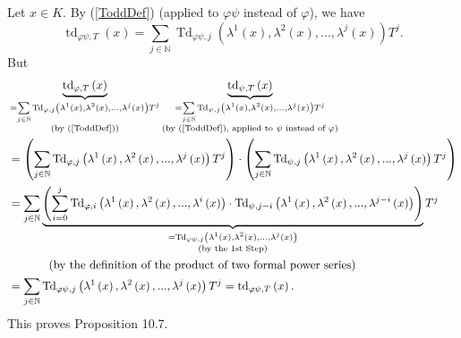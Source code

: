 \documentclass[numbers=enddot,12pt,final,onecolumn,notitlepage]{scrartcl}%
\begin{document}
Let $x\in K$. By (\ref{ToddDef}) (applied to $\varphi\psi$ instead of
$\varphi$), we have%
\[
\operatorname*{td}\nolimits_{\varphi\psi,T}\left(  x\right)  =\sum
_{j\in\mathbb{N}}\operatorname*{Td}\nolimits_{\varphi\psi,j}\left(
\lambda^{1}\left(  x\right)  ,\lambda^{2}\left(  x\right)  ,...,\lambda
^{j}\left(  x\right)  \right)  T^{j}.
\]
But%
\begin{align*}
&  \underbrace{\operatorname*{td}\nolimits_{\varphi,T}\left(  x\right)
}_{\substack{=\sum\limits_{j\in\mathbb{N}}\operatorname*{Td}\nolimits_{\varphi
,j}\left(  \lambda^{1}\left(  x\right)  ,\lambda^{2}\left(  x\right)
,...,\lambda^{j}\left(  x\right)  \right)  T^{j}\\\text{(by (\ref{ToddDef}))}%
}}\underbrace{\operatorname*{td}\nolimits_{\psi,T}\left(  x\right)
}_{\substack{=\sum\limits_{j\in\mathbb{N}}\operatorname*{Td}\nolimits_{\psi
,j}\left(  \lambda^{1}\left(  x\right)  ,\lambda^{2}\left(  x\right)
,...,\lambda^{j}\left(  x\right)  \right)  T^{j}\\\text{(by (\ref{ToddDef}),
applied to }\psi\text{ instead of }\varphi\text{)}}}\\
&  =\left(  \sum\limits_{j\in\mathbb{N}}\operatorname*{Td}\nolimits_{\varphi
,j}\left(  \lambda^{1}\left(  x\right)  ,\lambda^{2}\left(  x\right)
,...,\lambda^{j}\left(  x\right)  \right)  T^{j}\right)  \cdot\left(
\sum\limits_{j\in\mathbb{N}}\operatorname*{Td}\nolimits_{\psi,j}\left(
\lambda^{1}\left(  x\right)  ,\lambda^{2}\left(  x\right)  ,...,\lambda
^{j}\left(  x\right)  \right)  T^{j}\right) \\
&  =\sum\limits_{j\in\mathbb{N}}\underbrace{\left(  \sum\limits_{i=0}%
^{j}\operatorname*{Td}\nolimits_{\varphi,i}\left(  \lambda^{1}\left(
x\right)  ,\lambda^{2}\left(  x\right)  ,...,\lambda^{i}\left(  x\right)
\right)  \cdot\operatorname*{Td}\nolimits_{\psi,j-i}\left(  \lambda^{1}\left(
x\right)  ,\lambda^{2}\left(  x\right)  ,...,\lambda^{j-i}\left(  x\right)
\right)  \right)  }_{\substack{=\operatorname*{Td}\nolimits_{\varphi\psi
,j}\left(  \lambda^{1}\left(  x\right)  ,\lambda^{2}\left(  x\right)
,...,\lambda^{j}\left(  x\right)  \right)  \\\text{(by the 1st Step)}}}T^{j}\\
&  \ \ \ \ \ \ \ \ \ \ \left(  \text{by the definition of the product of two
formal power series}\right) \\
&  =\sum_{j\in\mathbb{N}}\operatorname*{Td}\nolimits_{\varphi\psi,j}\left(
\lambda^{1}\left(  x\right)  ,\lambda^{2}\left(  x\right)  ,...,\lambda
^{j}\left(  x\right)  \right)  T^{j}=\operatorname*{td}\nolimits_{\varphi
\psi,T}\left(  x\right)  .
\end{align*}
This proves Proposition 10.7.
\end{document}
